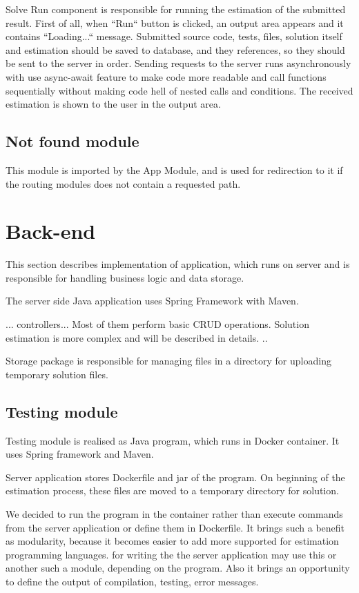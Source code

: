 Solve Run component is responsible for running the estimation of the submitted result. First of all, when ``Run`` button is clicked, an output area appears and it contains ``Loading...`` message. Submitted source code, tests, files, solution itself and estimation should be saved to database, and they references, so they should be sent to the server in order. Sending requests to the server runs asynchronously with use async-await feature to make code more readable and call functions sequentially without making code hell of nested calls and conditions. The received estimation is shown to the user in the output area.

\subsection{Not found module}
This module is imported by the App Module, and is used for redirection to it if the routing modules does not contain a requested path.


\section{Back-end}
This section describes implementation of application, which runs on server and is responsible for handling business logic and data storage.

The server side Java application uses Spring Framework with Maven.

... controllers... Most of them perform basic CRUD operations. Solution estimation is more complex and will be described in details. ..

Storage package is responsible for managing files in a directory for uploading temporary solution files.





\subsection{Testing module}
Testing module is realised as Java program, which runs in Docker container. It uses Spring framework and Maven.

Server application stores Dockerfile and jar of the program. On beginning of the estimation process, these files are moved to a temporary directory for solution. 

We decided to run the program in the container rather than execute commands from the server application or define them in Dockerfile. It brings such a benefit as modularity, because it becomes easier to add more supported for estimation programming languages. 
for writing the  the server application may use this or another such a module, depending on the program. Also it brings an opportunity to define the output of compilation, testing, error messages.

